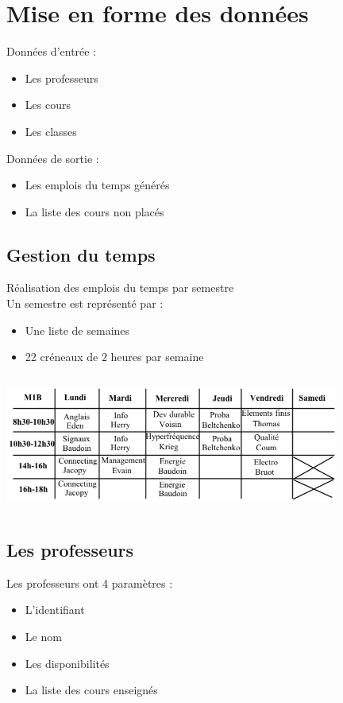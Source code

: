 \documentclass{beamer}
\begin{document}
\section{Mise en forme des données}
\begin{frame}
Données d'entrée : 
\begin{itemize}
\item Les professeurs
\item Les cours
\item Les classes
\end{itemize}
\vspace{\baselineskip}
Données de sortie :
\begin{itemize}
\item Les emplois du temps générés
\item La liste des cours non placés
\end{itemize}
\end{frame}

\subsection{Gestion du temps}
\begin{frame}
Réalisation des emplois du temps par semestre\\
\vspace{\baselineskip}
Un semestre est représenté par :
\begin{itemize}
\item Une liste de semaines
\item 22 créneaux de 2 heures par semaine
\end{itemize}
\end{frame}

\begin{frame}
\begin{center}
\includegraphics [width=110mm, height=45mm]{Dessin2.png}
\end{center}
\end{frame}

\subsection{Les professeurs}
\begin{frame} 
Les professeurs ont 4 paramètres : 
\begin{itemize}
\item L'identifiant
\item Le nom
\item Les disponibilités
\item La liste des cours enseignés
\end{itemize}
\end{frame}
\end{document}
